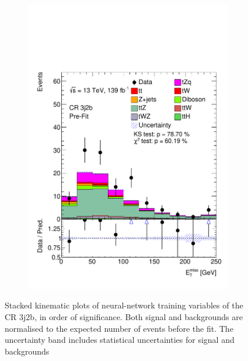 \begin{figure}
\begin{subfigure}[b]{0.32\linewidth}
    \includegraphics[width=\linewidth]{ubonn-thesis/Chapters/Chapters_06/Figure/Input_distribution/CR_3j2b_MissEt.pdf} 
  \end{subfigure} 
  \caption{Stacked kinematic plots of neural-network training variables of the CR 3j2b, in order of significance. Both signal and backgrounds are normalised to the expected number of events before the fit. The uncertainty band includes statistical uncertainties for signal and backgrounds}
  \label{fig_control2} 
\end{figure}

